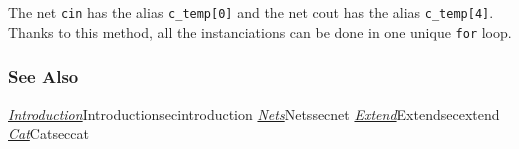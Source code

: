 \indent The net \verb-cin- has the alias \verb-c_temp[0]- and the net cout has the alias \verb-c_temp[4]-. Thanks to this method, all the instanciations can be done in one unique \verb-for- loop.
     
\subsubsection{See Also}

\hyperref[ref]{\emph{Introduction}}{}{Introduction}{secintroduction}
\hyperref[ref]{\emph{Nets}}{}{Nets}{secnet}
\hyperref[ref]{\emph{Extend}}{}{Extend}{secextend}
\hyperref[ref]{\emph{Cat}}{}{Cat}{seccat}
